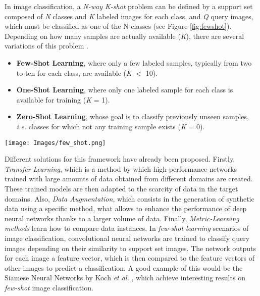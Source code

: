 In image classification, a \emph{N-way K-shot} problem can be defined by a support set composed of \emph{N} classes and \emph{K} labeled images for each class,  and \emph{Q} query images, which must be classified as one of the N classes (see Figure \ref{fig:fewshot}). Depending on how many samples are actually available (\emph{K}), there are several variations of this problem \cite{ettiene2020meta}.
\begin{itemize}[]
	 \item[\tiny$\blacksquare$] \textbf{Few-Shot Learning}, where only a few labeled samples, typically from two to ten for each class, are available (\emph{K} $<$ 10).      
     \item[\tiny$\blacksquare$] \textbf{One-Shot Learning}, where only one labeled sample for each class is available for training (\emph{K} = 1).
     \item[\tiny$\blacksquare$] \textbf{Zero-Shot Learning}, whose goal is to classify previously unseen samples, \emph{i.e.} classes for which not any training sample exists (\emph{K} = 0).  
\end{itemize}

\begin{figure*}[htbp]
        \centering            
        \texttt{[image: Images/few\_shot.png]}
        \caption[A 3-way 2-shot classification problem. Images from the query set would need to be
classified into Labrador, Saint-Bernard and Pug classes \cite{ettiene2020meta}.]
        {\small A 3-way 2-shot classification problem. Images from the query set would need to be
classified into Labrador, Saint-Bernard and Pug classes \cite{ettiene2020meta}.} 
        \label{fig:fewshot}
    \end{figure*}

Different solutions for this framework have already been proposed. Firstly, \emph{Transfer Learning}, which is a method by which high-performance networks trained with large amounts of data obtained from different domains are created. These trained models are then adapted to the scarcity of data in the target domains. Also, \emph{Data Augmentation}, which consists in the generation of synthetic data using a specific method, what allows to enhance the performance of deep neural networks thanks to a larger volume of data. Finally, \emph{Metric-Learning methods} learn how to compare data instances. In \emph{few-shot learning} scenarios of image classification, convolutional neural networks are trained to classify query images depending on their similarity to support set images. The network outputs for each image a feature vector, which is then compared to the feature vectors of other images to predict a classification. A good example of this would be the Siamese Neural Networks by Koch \emph{et al.} \cite{koch2015siamese}, which achieve interesting results on \emph{few-shot} image classification.

